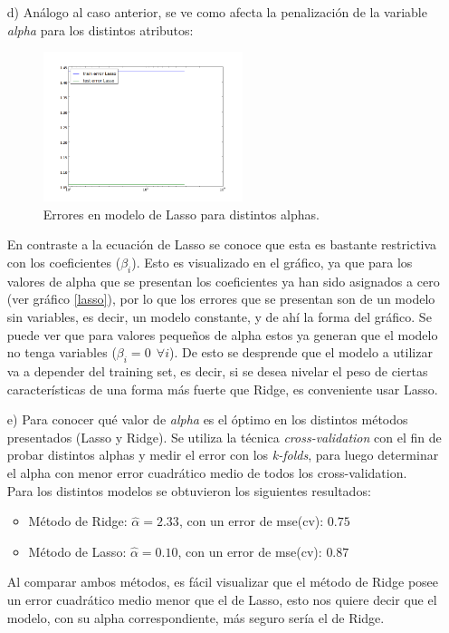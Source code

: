 \documentclass[10pt]{article}
\begin{document}
\begin{itemize}
\item[d)] Análogo al caso anterior, se ve como afecta la penalización de la variable \textit{alpha} para los distintos atributos:

\begin{figure}[H]
   \centering
   \includegraphics[width=0.55\textwidth]{images/alphas_lasso}
   \caption{Errores en modelo de Lasso para distintos alphas.}
   \label{err:lasso}
\end{figure}

En contraste a la ecuación de Lasso se conoce que esta es bastante restrictiva con los coeficientes ($\beta_i$). Esto es visualizado en el gráfico, ya que para los valores de alpha que se presentan los coeficientes ya han sido asignados a cero (ver gráfico \ref{lasso}), por lo que los errores que se presentan son de un modelo sin variables, es decir, un modelo constante, y de ahí la forma del gráfico. Se puede ver que para valores pequeños de alpha estos ya generan que el modelo no tenga variables ($\beta_i = 0 \ \ \forall i$). De esto se desprende que el modelo a utilizar va a depender del training set, es decir, si se desea nivelar el peso de ciertas características de una forma más fuerte que Ridge, es conveniente usar Lasso.


\item[e)] Para conocer qué valor de \textit{alpha} es el óptimo en los distintos métodos presentados (Lasso y Ridge). Se utiliza la técnica \textit{cross-validation} con el fin de probar distintos alphas y medir el error con los \textit{k-folds}, para luego determinar el alpha con menor error cuadrático medio de todos los cross-validation.\\

Para los distintos modelos se obtuvieron los siguientes resultados:

\begin{itemize}

\item Método de Ridge: $\hat{\alpha} = 2.33$, con un error de mse(cv): $0.75$
\item Método de Lasso: $\hat{\alpha} = 0.10$, con un error de mse(cv): $0.87$

\end{itemize}

Al comparar ambos métodos, es fácil visualizar que el método de Ridge posee un error cuadrático medio menor que el de Lasso, esto nos quiere decir que el modelo, con su alpha correspondiente, más seguro sería el de Ridge.





\end{itemize}
\end{document}
